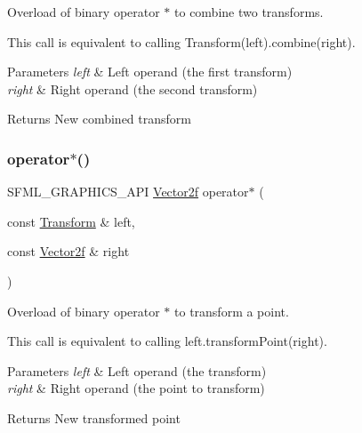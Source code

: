 Overload of binary operator $\ast$ to combine two transforms. 

This call is equivalent to calling Transform(left).combine(right).


\begin{DoxyParams}{Parameters}
{\em left} & Left operand (the first transform) \\
\hline
{\em right} & Right operand (the second transform)\\
\hline
\end{DoxyParams}
\begin{DoxyReturn}{Returns}
New combined transform 
\end{DoxyReturn}
\mbox{\label{classsf_1_1_transform_ac729169ec3036f3f3f3024c98efd041d}} 
\subsubsection{\texorpdfstring{operator$\ast$()}{operator*()}\hspace{0.1cm}{\footnotesize\ttfamily [2/2]}}
{\footnotesize\ttfamily S\+F\+M\+L\+\_\+\+G\+R\+A\+P\+H\+I\+C\+S\+\_\+\+A\+PI \hyperlink{classsf_1_1_vector2}{Vector2f} operator$\ast$ (\begin{DoxyParamCaption}\item[{const \hyperlink{classsf_1_1_transform}{Transform} \&}]{left,  }\item[{const \hyperlink{classsf_1_1_vector2}{Vector2f} \&}]{right }\end{DoxyParamCaption})\hspace{0.3cm}{\ttfamily [related]}}



Overload of binary operator $\ast$ to transform a point. 

This call is equivalent to calling left.\+transform\+Point(right).


\begin{DoxyParams}{Parameters}
{\em left} & Left operand (the transform) \\
\hline
{\em right} & Right operand (the point to transform)\\
\hline
\end{DoxyParams}
\begin{DoxyReturn}{Returns}
New transformed point 
\end{DoxyReturn}
\mbox{\label{classsf_1_1_transform_a45a9de70a463117f851f1264a6f558ba}} 
